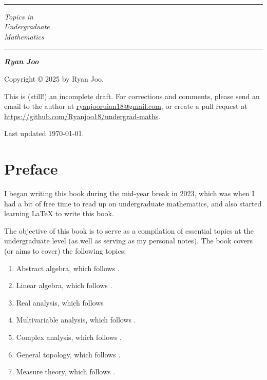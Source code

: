 \thispagestyle{empty}

\

\vspace{2cm}

\hrule height 2pt 

\vspace{1.5cm}

\begin{center}
\textit{\fontsize{40}{48}\selectfont
Topics in\\[0.5em]
Undergraduate\\[0.5em]
Mathematics}

\vspace{1.5cm}

\hrule height 2pt 

\vspace{2cm}

\textit{\bfseries\huge Ryan Joo}
\end{center}

\vfill

Copyright \copyright{} 2025 by Ryan Joo.

This is (still!) an incomplete draft. For corrections and comments, please send an email to the author at \href{mailto:ryanjooruian18@gmail.com}{ryanjooruian18@gmail.com}, or create a pull request at \url{https://github.com/Ryanjoo18/undergrad-maths}.

Last updated \today.
\pagebreak

\frontmatter
\section*{Preface}
I began writing this book during the mid-year break in 2023, which was when I had a bit of free time to read up on undergraduate mathematics, and also started learning \LaTeX{} to write this book. 

The objective of this book is to serve as a compilation of essential topics at the undergraduate level (as well as serving as my personal notes).
The book covers (or aims to cover) the following topics:
\begin{enumerate}
\item Abstract algebra, which follows \cite{dummit-foote,lang-undergrad-algebra}.
\item Linear algebra, which follows \cite{ladr}.
\item Real analysis, which follows \cite{rudin,apostol}
\item Multivariable analysis, which follows \cite{spivak-manifolds,rudin}.
\item Complex analysis, which follows \cite{stein-shakarchi}.
\item General topology, which follows \cite{munkres}.
\item Measure theory, which follows \cite{folland}.
\end{enumerate}

